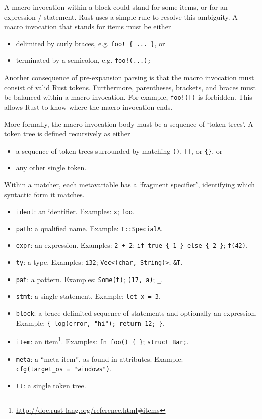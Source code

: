 \documentclass[a4paper,]{book}
\renewcommand{\href}[2]{#2\footnote{\url{#1}}}
\providecommand{\tightlist}{%
  \setlength{\itemsep}{0pt}\setlength{\parskip}{0pt}}
\begin{document}
A macro invocation within a block could stand for some items, or for an
expression / statement. Rust uses a simple rule to resolve this
ambiguity. A macro invocation that stands for items must be either

\begin{itemize}
\tightlist
\item
  delimited by curly braces, e.g. \texttt{foo!\ \{\ ...\ \}}, or
\item
  terminated by a semicolon, e.g. \texttt{foo!(...);}
\end{itemize}

Another consequence of pre-expansion parsing is that the macro
invocation must consist of valid Rust tokens. Furthermore, parentheses,
brackets, and braces must be balanced within a macro invocation. For
example, \texttt{foo!({[})} is forbidden. This allows Rust to know where
the macro invocation ends.

More formally, the macro invocation body must be a sequence of `token
trees'. A token tree is defined recursively as either

\begin{itemize}
\tightlist
\item
  a sequence of token trees surrounded by matching \texttt{()},
  \texttt{{[}{]}}, or \texttt{\{\}}, or
\item
  any other single token.
\end{itemize}

Within a matcher, each metavariable has a `fragment specifier',
identifying which syntactic form it matches.

\begin{itemize}
\tightlist
\item
  \texttt{ident}: an identifier. Examples: \texttt{x}; \texttt{foo}.
\item
  \texttt{path}: a qualified name. Example: \texttt{T::SpecialA}.
\item
  \texttt{expr}: an expression. Examples: \texttt{2\ +\ 2};
  \texttt{if\ true\ \{\ 1\ \}\ else\ \{\ 2\ \}}; \texttt{f(42)}.
\item
  \texttt{ty}: a type. Examples: \texttt{i32};
  \texttt{Vec\textless{}(char,\ String)\textgreater{}}; \texttt{\&T}.
\item
  \texttt{pat}: a pattern. Examples: \texttt{Some(t)};
  \texttt{(17,\ \textquotesingle{}a\textquotesingle{})}; \texttt{\_}.
\item
  \texttt{stmt}: a single statement. Example: \texttt{let\ x\ =\ 3}.
\item
  \texttt{block}: a brace-delimited sequence of statements and
  optionally an expression. Example:
  \texttt{\{\ log(error,\ "hi");\ return\ 12;\ \}}.
\item
  \texttt{item}: an
  \href{http://doc.rust-lang.org/reference.html\#items}{item}. Examples:
  \texttt{fn\ foo()\ \{\ \}}; \texttt{struct\ Bar;}.
\item
  \texttt{meta}: a ``meta item'', as found in attributes. Example:
  \texttt{cfg(target\_os\ =\ "windows")}.
\item
  \texttt{tt}: a single token tree.
\end{itemize}
\end{document}
